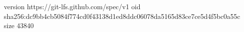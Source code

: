 version https://git-lfs.github.com/spec/v1
oid sha256:dc9bb4cb5084f774cd0f43138d1ed8ddc06078da5165d83ce7ce5d4f5bc0a55c
size 43840
